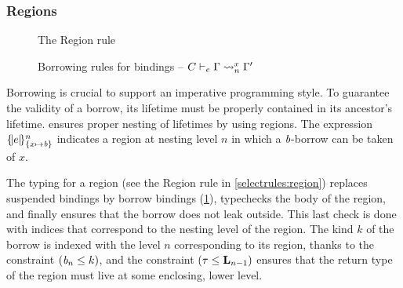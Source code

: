 \subsubsection{Regions}
\label{sdtyping:regions}
\begin{figure}[tp]
  \begin{minipage}{0.4\linewidth}
    \centering
    \begin{mathpar}
    \end{mathpar}
    \caption{The {\sc Region} rule}
    \label{selectrules:region}
  \end{minipage}\hfill
  \begin{minipage}{0.6\linewidth}
    \centering


    \begin{mathpar}
    \end{mathpar}
    \caption{Borrowing rules for bindings -- $\lregion{C}{x}{\E}{\E'}$}
    \label{env:rule:borrow}
  \end{minipage}
\end{figure}

Borrowing is crucial to support an imperative programming style.
To guarantee the validity of a borrow, its lifetime must be properly contained in its
ancestor's lifetime. \lang ensures proper nesting of lifetimes by using
regions. The expression $\region{\Sone x\BORROW}{e}$ indicates a
region at nesting level $n$ in which a $\BORROW$-borrow can be taken of $x$.

The typing for a region (see the {\sc Region} rule in \cref{selectrules:region})
replaces suspended bindings by borrow bindings
(\cref{env:rule:borrow}), typechecks the body
of the region, and finally ensures that the borrow does not leak outside.
This last check is done with indices that correspond to the nesting
level of the region. The kind $k$ of the borrow is indexed with the level $n$
corresponding to its region, thanks to the constraint $(\BORROW_n\lk
k)$, and the constraint $\Cleq{\tau}{\klin_{n-1}}$ ensures that
the return type of the region must live at some enclosing, lower level.

